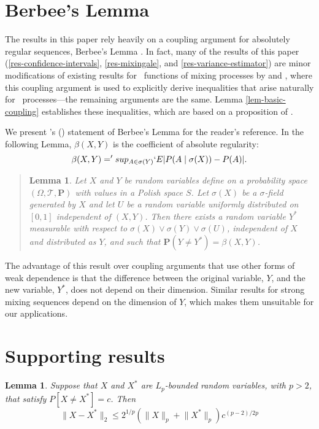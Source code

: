 \documentclass[11pt]{article}
\newtheorem{lem}[thm]{Lemma}
\newcommand{\E}{`E}
\begin{document}
\appendix
\section{Berbee's Lemma}
The results in this paper rely heavily on a coupling argument for
absolutely regular sequences, Berbee's Lemma
\citep{berbee_random_1979}.  In fact, many of the results of this
paper (\ref{res-confidence-intervals}, \ref{res-mixingale}, and
\ref{res-variance-estimator}) are minor modifications of existing
results for \ned\ functions of mixing processes by 
\citet{de_jong_central_1997} and \citet{de_jong_consistency_2000},
where this coupling argument is used to explicitly derive inequalities
that arise naturally for \ned\ processes---the remaining arguments are
the same.  Lemma
\ref{lem-basic-coupling} establishes these inequalities, which are
based on a proposition of \citet{merlevede_coupling_2002}.

We present \citeauthor{merlevede_coupling_2002}'s
(\citeyear{merlevede_coupling_2002}) statement of Berbee's Lemma for
the reader's reference.  In the following Lemma, $\beta(X,Y)$ is the
coefficient of absolute regularity:
\[
\beta(X,Y) = 'sup_{A \in \sigma(Y)} \E \lvert P(A \mid \sigma(X))
  - P(A) \rvert.
\]
\begin{quotation}
\begin{lem}\label{lem-berbee}
  Let $X$ and $Y$ be random variables define on a probability space
  $(\Omega, \mathcal{T}, \mathbf{P})$ with values in a Polish space
  $S$.  Let $\sigma(X)$ be a $\sigma$-field generated by $X$ and let
  $U$ be a random variable uniformly distributed on $[0,1]$
  independent of $(X,Y)$.  Then there exists a random variable $Y^{*}$
  measurable with respect to $\sigma(X) \vee \sigma(Y) \vee
  \sigma(U)$, independent of $X$ and distributed as $Y$, and such that
  $\mathbf{P}(Y \neq Y^{*}) = \beta(X,Y)$.
\end{lem}
\citep{merlevede_coupling_2002}
\end{quotation}

The advantage of this result over coupling arguments that use other
forms of weak dependence is that the difference between the original
variable, $Y$, and the new variable, $Y^{*}$, does not depend on their
dimension.  Similar results for strong mixing sequences depend on the
dimension of $Y$, which makes them unsuitable for our applications.

\section{Supporting results}
\begin{lem}\label{lem-extend-mp}
  Suppose that $X$ and $X^*$ are $L_p$-bounded random variables, with
  $p > 2$, that satisfy ${P[X \neq X^*] = c}$.  Then
  \[
    \lVert X - X^* \rVert_2 \leq 2^{1/p} (\lVert X \rVert_p + \lVert
    X^* \rVert_p) c^{(p-2)/2p}
  \]
\end{lem}
\end{document}

